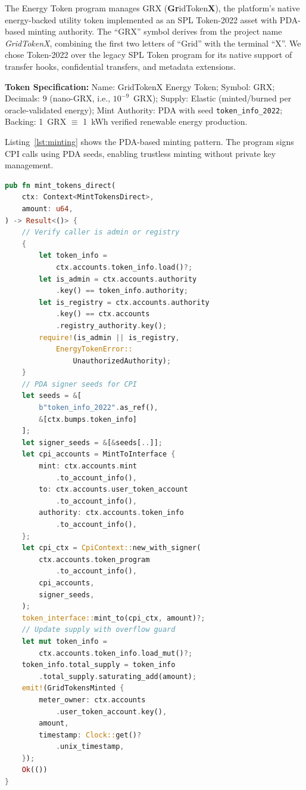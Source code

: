 \documentclass[conference]{IEEEtran}
\begin{document}
The Energy Token program manages GRX (\textbf{Gr}idToken\textbf{X}), the platform's native energy-backed utility token implemented as an SPL Token-2022 asset with PDA-based minting authority. The ``GRX'' symbol derives from the project name \textit{GridTokenX}, combining the first two letters of ``Grid'' with the terminal ``X''. We chose Token-2022 over the legacy SPL Token program for its native support of transfer hooks, confidential transfers, and metadata extensions.

\textbf{Token Specification:} Name: GridTokenX Energy Token; Symbol: GRX; Decimals: 9 (nano-GRX, i.e., $10^{-9}$~GRX); Supply: Elastic (minted/burned per oracle-validated energy); Mint Authority: PDA with seed \texttt{token\_info\_2022}; Backing: 1~GRX $\equiv$ 1~kWh verified renewable energy production.

Listing~\ref{lst:minting} shows the PDA-based minting pattern. The program signs CPI calls using PDA seeds, enabling trustless minting without private key management.

\begin{lstlisting}[language=Rust, caption={PDA-based token minting via CPI to SPL Token-2022 (from \texttt{energy-token/src/lib.rs})}, label={lst:minting}, float=htbp]
pub fn mint_tokens_direct(
    ctx: Context<MintTokensDirect>,
    amount: u64,
) -> Result<()> {
    // Verify caller is admin or registry
    {
        let token_info =
            ctx.accounts.token_info.load()?;
        let is_admin = ctx.accounts.authority
            .key() == token_info.authority;
        let is_registry = ctx.accounts.authority
            .key() == ctx.accounts
            .registry_authority.key();
        require!(is_admin || is_registry,
            EnergyTokenError::
                UnauthorizedAuthority);
    }
    // PDA signer seeds for CPI
    let seeds = &[
        b"token_info_2022".as_ref(),
        &[ctx.bumps.token_info]
    ];
    let signer_seeds = &[&seeds[..]];
    let cpi_accounts = MintToInterface {
        mint: ctx.accounts.mint
            .to_account_info(),
        to: ctx.accounts.user_token_account
            .to_account_info(),
        authority: ctx.accounts.token_info
            .to_account_info(),
    };
    let cpi_ctx = CpiContext::new_with_signer(
        ctx.accounts.token_program
            .to_account_info(),
        cpi_accounts,
        signer_seeds,
    );
    token_interface::mint_to(cpi_ctx, amount)?;
    // Update supply with overflow guard
    let mut token_info =
        ctx.accounts.token_info.load_mut()?;
    token_info.total_supply = token_info
        .total_supply.saturating_add(amount);
    emit!(GridTokensMinted {
        meter_owner: ctx.accounts
            .user_token_account.key(),
        amount,
        timestamp: Clock::get()?
            .unix_timestamp,
    });
    Ok(())
}
\end{lstlisting}
\end{document}
